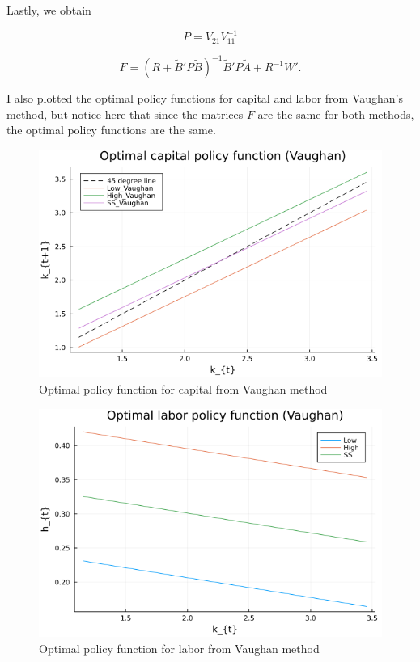 \documentclass{article}
\begin{document}
	 Lastly, we obtain
	 
	 $$P = V_{21}V_{11}^{-1}$$
	 
	 $$F = \left( R + \tilde{B}'P\tilde{B} \right)^{-1}\tilde{B}'P\tilde{A} + R^{-1}W'.$$
	 
	 I also plotted the optimal policy functions for capital and labor from Vaughan's method, but notice here that since the matrices $F$ are the same for both methods, the optimal policy functions are the same.
	 
	 \begin{figure}[htbp]
		\centering
		\includegraphics[scale=0.5]{kpol_Vaughan.png}
		\caption{Optimal policy function for capital from Vaughan method}
	\end{figure}
	
	\begin{figure}[htbp]
		\centering
		\includegraphics[scale=0.5]{hpol_Vaughan.png}
		\caption{Optimal policy function for labor from Vaughan method}
	\end{figure}
	
	
\end{document}
